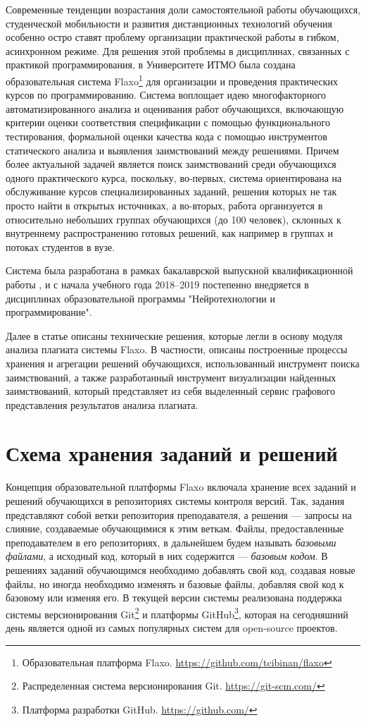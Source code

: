 \documentclass[a4paper,14pt]{extarticle}
\begin{document}
Современные тенденции возрастания доли самостоятельной работы обучающихся, студенческой мобильности и развития дистанционных технологий обучения особенно остро ставят проблему организации практической работы в гибком, асинхронном режиме. Для решения этой проблемы в дисциплинах, связанных с практикой программирования, в Университете ИТМО была создана образовательная система Flaxo\footnote{Образовательная платформа Flaxo. \url{https://github.com/tcibinan/flaxo}} для организации и проведения практических курсов по программированию. Система воплощает идею многофакторного автоматизированного анализа и оценивания работ обучающихся, включающую критерии оценки соответствия спецификации с помощью функционального тестирования, формальной оценки качества кода с помощью инструментов статического анализа и выявления заимствований между решениями. Причем более актуальной задачей является поиск заимствований среди обучающихся одного практического курса, поскольку, во-первых, система ориентирована на обслуживание курсов специализированных заданий, решения которых не так просто найти в открытых источниках, а во-вторых, работа организуется в относительно небольших группах обучающихся (до 100 человек), склонных к внутреннему распространению готовых решений, как например в группах и потоках студентов в вузе.

Система была разработана в рамках бакалаврской выпускной квалификационной работы \citep{flaxoThesis}\citep{flaxoKmu}, и с начала учебного года 2018--2019 постепенно внедряется в дисциплинах образовательной программы "Нейротехнологии и программирование".

Далее в статье описаны технические решения, которые легли в основу модуля анализа плагиата системы Flaxo. В частности, описаны построенные процессы хранения и агрегации решений обучающихся, использованный инструмент поиска заимствований, а также разработанный инструмент визуализации найденных заимствований, который представляет из себя выделенный сервис графового представления результатов анализа плагиата.

\section{Схема хранения заданий и решений}

Концепция образовательной платформы Flaxo включала хранение всех заданий и решений обучающихся в репозиториях системы контроля версий. Так, задания представляют собой ветки репозитория преподавателя, а решения --- запросы на слияние, создаваемые обучающимися к этим веткам. Файлы, предоставленные преподавателем в его репозиториях, в дальнейшем будем называть \textit{базовыми файлами}, а исходный код, который в них содержится --- \textit{базовым кодом}. В решениях заданий обучающимся необходимо добавлять свой код, создавая новые файлы, но иногда необходимо изменять и базовые файлы, добавляя свой код к базовому или изменяя его. В текущей версии системы реализована поддержка системы версионирования Git\footnote{Распределенная система версионирования Git. \url{https://git-scm.com/}} и платформы GitHub\footnote{Платформа разработки GitHub. \url{https://github.com/}}, которая на сегодняшний день является одной из самых популярных систем для open-source проектов.
\end{document}
